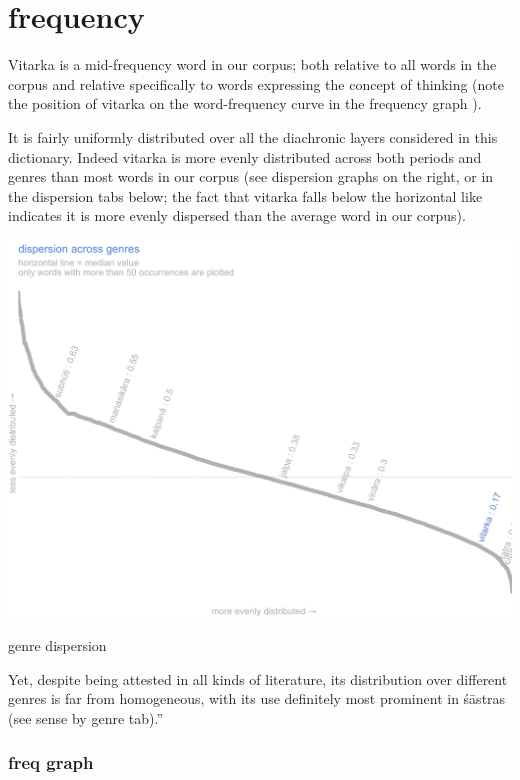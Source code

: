 \documentclass[
  letterpaper,
  DIV=11,
  numbers=noendperiod,
  oneside]{scrreprt}
\begin{document}
\hypertarget{frequency}{%
\section{frequency}\label{frequency}}

Vitarka is a mid-frequency word in our corpus; both relative to all
words in the corpus and relative specifically to words expressing the
concept of thinking (note the position of vitarka on the word-frequency
curve in the frequency graph ).

It is fairly uniformly distributed over all the diachronic layers
considered in this dictionary. Indeed vitarka is more evenly distributed
across both periods and genres than most words in our corpus (see
dispersion graphs on the right, or in the dispersion tabs below; the
fact that vitarka falls below the horizontal like indicates it is more
evenly dispersed than the average word in our corpus).

\begin{marginfigure}

{\centering \includegraphics{./www/genreDP_vitarka.webp}

}

\caption{genre dispersion}

\end{marginfigure}

Yet, despite being attested in all kinds of literature, its distribution
over different genres is far from homogeneous, with its use definitely
most prominent in śāstras (see sense by genre tab).''

\hypertarget{sec-freqcurve}{%
\subsubsection{freq graph}\label{sec-freqcurve}}
\end{document}
